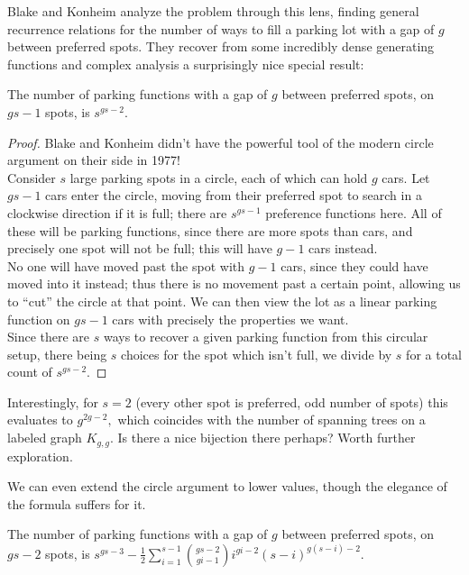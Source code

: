 Blake and Konheim analyze the problem through this lens, finding general recurrence relations for the number of ways to fill a parking lot with a gap of $g$ between preferred spots. They recover from some incredibly dense generating functions and complex analysis a surprisingly nice special result:

\begin{proposition}
    The number of parking functions with a gap of $g$ between preferred spots, on $gs-1$ spots, is $s^{gs-2}.$
\end{proposition}

\begin{proof}
    Blake and Konheim didn't have the powerful tool of the modern circle argument on their side in 1977!\\

    Consider $s$ large parking spots in a circle, each of which can hold $g$ cars. Let $gs-1$ cars enter the circle, moving from their preferred spot to search in a clockwise direction if it is full; there are $s^{gs-1}$ preference functions here. All of these will be parking functions, since there are more spots than cars, and precisely one spot will not be full; this will have $g-1$ cars instead.\\

    No one will have moved past the spot with $g-1$ cars, since they could have moved into it instead; thus there is no movement past a certain point, allowing us to ``cut'' the circle at that point. We can then view the lot as a linear parking function on $gs-1$ cars with precisely the properties we want.\\

    Since there are $s$ ways to recover a given parking function from this circular setup, there being $s$ choices for the spot which isn't full, we divide by $s$ for a total count of $s^{gs-2}.$
\end{proof}

Interestingly, for $s=2$ (every other spot is preferred, odd number of spots) this evaluates to $g^{2g-2},$ which coincides with the number of spanning trees on a labeled graph $K_{g,g}.$ Is there a nice bijection there perhaps? Worth further exploration.

We can even extend the circle argument to lower values, though the elegance of the formula suffers for it.

\begin{proposition}
    The number of parking functions with a gap of $g$ between preferred spots, on $gs-2$ spots, is $\displaystyle s^{gs-3}-\frac{1}{2}\sum_{i=1}^{s-1}\binom{gs-2}{gi-1}i^{gi-2}(s-i)^{g(s-i)-2}.$
\end{proposition}

